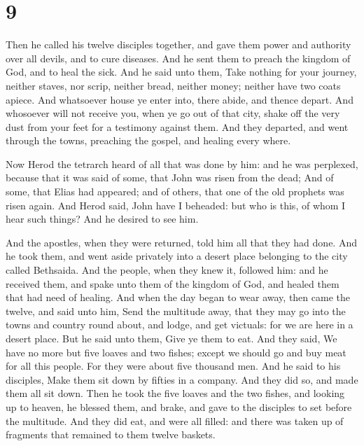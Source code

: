 \hypertarget{section-8}{%
\section{9}\label{section-8}}

 Then he called his twelve disciples together, and gave them
power and authority over all devils, and to cure diseases. 
And he sent them to preach the kingdom of God, and to heal the sick.
 And he said unto them, Take nothing for your journey,
neither staves, nor scrip, neither bread, neither money; neither have
two coats apiece.  And whatsoever house ye enter into, there
abide, and thence depart.  And whosoever will not receive
you, when ye go out of that city, shake off the very dust from your feet
for a testimony against them.  And they departed, and went
through the towns, preaching the gospel, and healing every where.

 Now Herod the tetrarch heard of all that was done by him:
and he was perplexed, because that it was said of some, that John was
risen from the dead;  And of some, that Elias had appeared;
and of others, that one of the old prophets was risen again.
 And Herod said, John have I beheaded: but who is this, of
whom I hear such things? And he desired to see him.

 And the apostles, when they were returned, told him all
that they had done. And he took them, and went aside privately into a
desert place belonging to the city called Bethsaida.  And
the people, when they knew it, followed him: and he received them, and
spake unto them of the kingdom of God, and healed them that had need of
healing.  And when the day began to wear away, then came
the twelve, and said unto him, Send the multitude away, that they may go
into the towns and country round about, and lodge, and get victuals: for
we are here in a desert place.  But he said unto them, Give
ye them to eat. And they said, We have no more but five loaves and two
fishes; except we should go and buy meat for all this people.
 For they were about five thousand men. And he said to his
disciples, Make them sit down by fifties in a company.  And
they did so, and made them all sit down.  Then he took the
five loaves and the two fishes, and looking up to heaven, he blessed
them, and brake, and gave to the disciples to set before the multitude.
 And they did eat, and were all filled: and there was taken
up of fragments that remained to them twelve baskets.

